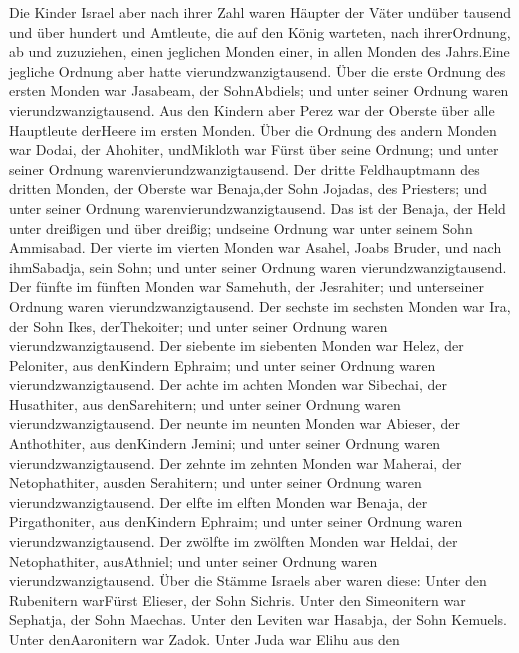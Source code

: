  Die Kinder Israel aber nach ihrer Zahl waren Häupter der
Väter undüber tausend und über hundert und Amtleute, die auf den König
warteten, nach ihrerOrdnung, ab und zuzuziehen, einen jeglichen Monden
einer, in allen Monden des Jahrs.Eine jegliche Ordnung aber hatte
vierundzwanzigtausend.  Über die erste Ordnung des ersten
Monden war Jasabeam, der SohnAbdiels; und unter seiner Ordnung waren
vierundzwanzigtausend.  Aus den Kindern aber Perez war der
Oberste über alle Hauptleute derHeere im ersten Monden. 
Über die Ordnung des andern Monden war Dodai, der Ahohiter, undMikloth
war Fürst über seine Ordnung; und unter seiner Ordnung
warenvierundzwanzigtausend.  Der dritte Feldhauptmann des
dritten Monden, der Oberste war Benaja,der Sohn Jojadas, des Priesters;
und unter seiner Ordnung warenvierundzwanzigtausend.  Das
ist der Benaja, der Held unter dreißigen und über dreißig; undseine
Ordnung war unter seinem Sohn Ammisabad.  Der vierte im
vierten Monden war Asahel, Joabs Bruder, und nach ihmSabadja, sein Sohn;
und unter seiner Ordnung waren vierundzwanzigtausend.  Der
fünfte im fünften Monden war Samehuth, der Jesrahiter; und unterseiner
Ordnung waren vierundzwanzigtausend.  Der sechste im
sechsten Monden war Ira, der Sohn Ikes, derThekoiter; und unter seiner
Ordnung waren vierundzwanzigtausend.  Der siebente im
siebenten Monden war Helez, der Peloniter, aus denKindern Ephraim; und
unter seiner Ordnung waren vierundzwanzigtausend.  Der
achte im achten Monden war Sibechai, der Husathiter, aus denSarehitern;
und unter seiner Ordnung waren vierundzwanzigtausend.  Der
neunte im neunten Monden war Abieser, der Anthothiter, aus denKindern
Jemini; und unter seiner Ordnung waren vierundzwanzigtausend.
 Der zehnte im zehnten Monden war Maherai, der
Netophathiter, ausden Serahitern; und unter seiner Ordnung waren
vierundzwanzigtausend.  Der elfte im elften Monden war
Benaja, der Pirgathoniter, aus denKindern Ephraim; und unter seiner
Ordnung waren vierundzwanzigtausend.  Der zwölfte im
zwölften Monden war Heldai, der Netophathiter, ausAthniel; und unter
seiner Ordnung waren vierundzwanzigtausend.  Über die
Stämme Israels aber waren diese: Unter den Rubenitern warFürst Elieser,
der Sohn Sichris. Unter den Simeonitern war Sephatja, der Sohn Maechas.
 Unter den Leviten war Hasabja, der Sohn Kemuels. Unter
denAaronitern war Zadok.  Unter Juda war Elihu aus den
